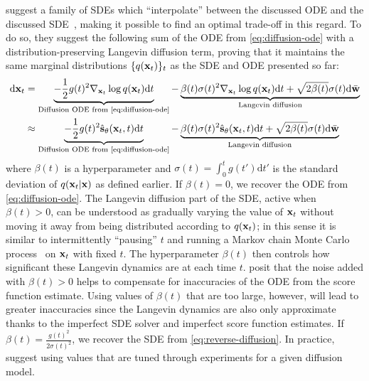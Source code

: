 \citet{karras2022elucidating} suggest a family of SDEs which ``interpolate'' between the discussed ODE and the discussed SDE~\citep{karras2022elucidating}, making it possible to find an optimal trade-off in this regard. To do so, they suggest the following sum of the ODE from \cref{eq:diffusion-ode} with a distribution-preserving Langevin diffusion term, proving that it maintains the same marginal distributions $\{q({\mathbf{x}}_t)\}_t$ as the SDE and ODE presented so far:
\begin{align}
    \mathrm{d}{\rvx_t} &= \underbrace{- \frac{1}{2} g(t)^2 \nabla_{\rvx_t} \log q(\rvx_t) \mathrm{d}t}_\text{Diffusion ODE from \cref{eq:diffusion-ode}} - \underbrace{\beta(t) \sigma(t)^2 \nabla_{\rvx_t} \log q(\rvx_t) \mathrm{d}t + \sqrt{2\beta(t)}\sigma(t)\mathrm{d}\bar{\rvw}}_\text{Langevin diffusion}  \label{eq:diffusion-edm-sde-exact} \\
    &\approx \underbrace{- \frac{1}{2} g(t)^2 \preds_\theta(\rvx_t, t) \mathrm{d}t}_\text{Diffusion ODE from \cref{eq:diffusion-ode}} - \underbrace{\beta(t) \sigma(t)^2 \preds_\theta(\rvx_t, t) \mathrm{d}t + \sqrt{2\beta(t)}\sigma(t)\mathrm{d}\bar{\rvw}}_\text{Langevin diffusion} \label{eq:diffusion-edm-sde-approx}
\end{align}
where $\beta(t)$ is a hyperparameter and $\sigma(t) = \int_0^t g(t') \mathrm{d}t'$ is the standard deviation of $q({\mathbf{x}}_t|{\mathbf{x}})$ as defined earlier. 
If $\beta(t) = 0$, we recover the ODE from \cref{eq:diffusion-ode}. The Langevin diffusion part of the SDE, active when $\beta(t) > 0$, can be understood as gradually varying the value of ${\mathbf{x}}_t$ without moving it away from being distributed according to $q({\mathbf{x}}_t)$; in this sense it is similar to intermittently ``pausing'' $t$ and running a Markov chain Monte Carlo process~\citep{bishop2006pattern} on ${\mathbf{x}}_t$ with fixed $t$. The hyperparameter $\beta(t)$ then controls how significant these Langevin dynamics are at each time $t$. \citet{karras2022elucidating} posit that the noise added with $\beta(t) > 0$ helps to compensate for inaccuracies of the ODE from the score function estimate. Using values of $\beta(t)$ that are too large, however, will lead to greater inaccuracies since the Langevin dynamics are also only approximate thanks to the imperfect SDE solver and imperfect score function estimates. If $\beta(t) = \frac{g(t)^2}{2 \sigma(t)^2}$, we recover the SDE from \cref{eq:reverse-diffusion}. In practice, \citet{karras2022elucidating} suggest using values that are tuned through experiments for a given diffusion model.


